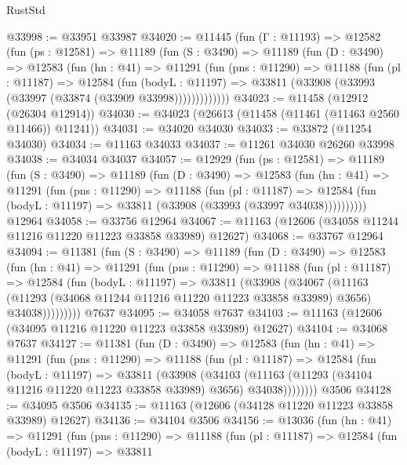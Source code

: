 \begin{lexlean}{RustStd}
\begin{coremodule}
@33998 := @33951 @33987
@34020 := @11445
    (fun (Γ : @11193) =>
    @12582
      (fun (ps : @12581) =>
      @11189
        (fun (S : @3490) =>
        @11189
          (fun (D : @3490) =>
          @12583
            (fun (hn : @41) =>
            @11291
              (fun (pns : @11290) =>
              @11188
                (fun (pl : @11187) =>
                @12584
                  (fun (bodyL : @11197) =>
                  @33811 (@33908 (@33993 (@33997 (@33874 (@33909 @33998)))))))))))))
@34023 := @11458 (@12912 (@26304 @12914))
@34030 := @34023 (@26613 (@11458 (@11461 (@11463 @2560 @11466)) @11241))
@34031 := @34020 @34030
@34033 := @33872 (@11254 @34030)
@34034 := @11163 @34033
@34037 := @11261 @34030 @26260 @33998
@34038 := @34034 @34037
@34057 := @12929
    (fun (ps : @12581) =>
    @11189
      (fun (S : @3490) =>
      @11189
        (fun (D : @3490) =>
        @12583
          (fun (hn : @41) =>
          @11291
            (fun (pns : @11290) =>
            @11188
              (fun (pl : @11187) =>
              @12584 (fun (bodyL : @11197) => @33811 (@33908 (@33993 (@33997 @34038))))))))))
    @12964
@34058 := @33756 @12964
@34067 := @11163 (@12606 (@34058 @11244 @11216 @11220 @11223 @33858 @33989) @12627)
@34068 := @33767 @12964
@34094 := @11381
    (fun (S : @3490) =>
    @11189
      (fun (D : @3490) =>
      @12583
        (fun (hn : @41) =>
        @11291
          (fun (pns : @11290) =>
          @11188
            (fun (pl : @11187) =>
            @12584
              (fun (bodyL : @11197) =>
              @33811
                (@33908
                  (@34067
                    (@11163
                      (@11293 (@34068 @11244 @11216 @11220 @11223 @33858 @33989) @3656)
                      @34038)))))))))
    @7637
@34095 := @34058 @7637
@34103 := @11163 (@12606 (@34095 @11216 @11220 @11223 @33858 @33989) @12627)
@34104 := @34068 @7637
@34127 := @11381
    (fun (D : @3490) =>
    @12583
      (fun (hn : @41) =>
      @11291
        (fun (pns : @11290) =>
        @11188
          (fun (pl : @11187) =>
          @12584
            (fun (bodyL : @11197) =>
            @33811
              (@33908
                (@34103
                  (@11163 (@11293 (@34104 @11216 @11220 @11223 @33858 @33989) @3656) @34038))))))))
    @3506
@34128 := @34095 @3506
@34135 := @11163 (@12606 (@34128 @11220 @11223 @33858 @33989) @12627)
@34136 := @34104 @3506
@34156 := @13036
    (fun (hn : @41) =>
    @11291
      (fun (pns : @11290) =>
      @11188
        (fun (pl : @11187) =>
        @12584
          (fun (bodyL : @11197) =>
          @33811

\end{coremodule}
\end{lexlean}
